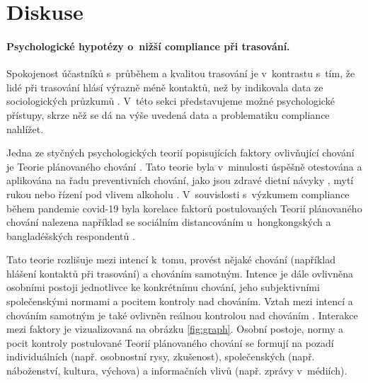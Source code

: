\section*{Diskuse}
\paragraph*{Psychologické hypotézy o~nižší compliance při trasování.}
Spokojenost účastníků s~průběhem a kvalitou trasování je v~kontrastu s~tím, že lidé při trasování hlásí výrazně méně kontaktů, než by indikovala data ze sociologických průzkumů \cite{Prokop2020a}. V~této sekci představujeme možné psychologické přístupy, skrze něž se dá na výše uvedená data a problematiku compliance nahlížet.  

Jedna ze styčných psychologických teorií popisujících faktory ovlivňující chování je Teorie plánovaného chování \cite{Ajzen1985}. Tato teorie byla v~minulosti úspěšně otestována a aplikována na řadu preventivních chování, jako jsou zdravé dietní návyky \cite{Hackman2014}, mytí rukou \cite{Hackman2014} nebo řízení pod vlivem alkoholu \cite{Moan2011}. V~souvislosti s~výzkumem compliance během pandemie covid-19 byla korelace faktorů postulovaných Teorií plánovaného chování nalezena například se sociálním distancováním u~hongkongských \cite{Yu2021} a bangladéšských respondentů \cite{Das2021}. 

Tato teorie rozlišuje mezi intencí k~tomu, provést nějaké chování (například hlášení kontaktů při trasování) a chováním samotným. Intence je dále ovlivněna osobními postoji jednotlivce ke konkrétnímu chování, jeho subjektivními společenskými normami a pocitem kontroly nad chováním. 
Vztah mezi intencí a chováním samotným je také ovlivněn reálnou kontrolou nad chováním \cite{Ajzen1985}. Interakce mezi faktory je vizualizovaná na obrázku \ref{fig:graph}. Osobní postoje, normy a pocit kontroly postulované Teorií plánovaného chování se formují na pozadí individuálních (např. osobnostní rysy, zkušenost), společenských (např. náboženství, kultura, výchova) a informačních vlivů (např. zprávy v~médiích). 


